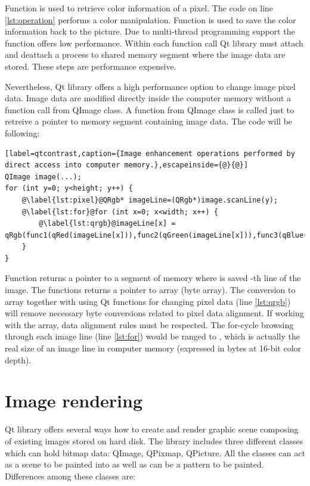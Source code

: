 Function  is used to retrieve color information of a pixel. The code on line \ref{lst:operation} performs a color manipulation. Function  is used to save the color information back to the picture. Due to multi-thread programming support the  function offers low performance. Within each function call Qt library must attach and deattach a process to shared memory segment where the image data are stored. These steps are performance expensive.

Nevertheless, Qt library offers a high performance option to change image pixel data. Image data are modified directly inside the computer memory without a function call from QImage class. A function from QImage class is called just to retreive a pointer to memory segment containing image data. The code will be following:

\begin{lstlisting}[label=qtcontrast,caption={Image enhancement operations performed by direct access into computer memory.},escapeinside={@}{@}]
QImage image(...);
for (int y=0; y<height; y++) {
	@\label{lst:pixel}@QRgb* imageLine=(QRgb*)image.scanLine(y);
	@\label{lst:for}@for (int x=0; x<width; x++) {
		@\label{lst:qrgb}@imageLine[x] = qRgb(func1(qRed(imageLine[x])),func2(qGreen(imageLine[x])),func3(qBlue(imageLine[x])));
	}
}
\end{lstlisting}

Function  returns a pointer to a segment of memory where is saved -th line of the image. The  functions returns a pointer to  array (byte array). The conversion to  array together with using Qt functions for changing pixel data (line \ref{lst:qrgb}) will remove necessary byte conversions related to pixel data alignment. If working with the  array, data alignment rules must be respected. The for-cycle browsing through each image line (line \ref{lst:for}) would be ranged to , which is actually the real size of an image line in computer memory (expressed in bytes at 16-bit color depth).


\section{Image rendering}

Qt library offers several ways how to create and render graphic scene composing of existing images stored on hard disk. The library includes three different classes which can hold bitmap data: QImage, QPixmap, QPicture. All the classes can act as a scene to be painted into as well as can be a pattern to be painted. Differences among these classes are:

